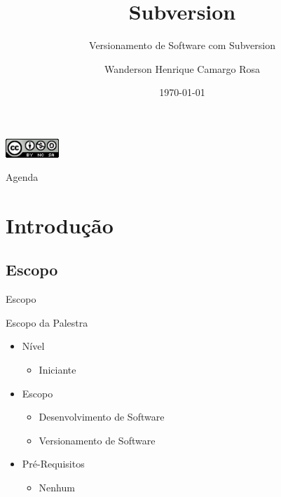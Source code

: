 \documentclass[hyperref={pdfpagelabels=false}]{beamer}
\title[SVN]{Subversion}
\subtitle[Versionamento]{Versionamento de Software com Subversion}
\author[CAMARGO]{Wanderson Henrique Camargo Rosa}
\institute[UNISINOS]{Universidade do Vale do Rio dos Sinos --- UNISINOS}
\date{\today{}}
\begin{document}
\begin{frame}
    \maketitle{}
    \begin{center}
        \includegraphics[width=20mm]{src/CC-BY-NC-SA-icon-88x31.png}
    \end{center}
\end{frame}

\begin{frame}{Agenda}
    \tableofcontents{}
\end{frame}

\section{Introdução}
\label{sec:introducao}

\subsection{Escopo}

\begin{frame}{Escopo}
    \begin{block}{Escopo da Palestra}
        \begin{itemize}
            \item Nível
            \begin{itemize}
                \item Iniciante
            \end{itemize}
            \item Escopo
            \begin{itemize}
                \item Desenvolvimento de Software
                \item Versionamento de Software
            \end{itemize}
            \item Pré-Requisitos
            \begin{itemize}
                \item Nenhum
            \end{itemize}
        \end{itemize}
    \end{block}
\end{frame}
\end{document}
